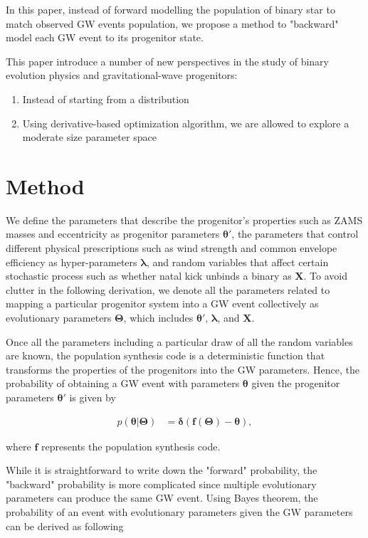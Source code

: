 \documentclass[twocolumn]{aastex631}
\begin{document}
In this paper, instead of forward modelling the population of binary star to match observed GW events population,
we propose a method to "backward" model each GW event to its progenitor state.


This paper introduce a number of new perspectives in the study of binary evolution physics and gravitational-wave progenitors:
\begin{enumerate}
\item Instead of starting from a distribution 
\item Using derivative-based optimization algorithm, we are allowed to explore a moderate size parameter space 
\end{enumerate}

\section{Method}

We define the parameters that describe the progenitor's properties such as ZAMS masses and eccentricity as progenitor parameters $\bm{\theta'}$,
the parameters that control different physical prescriptions such as wind strength and common envelope efficiency as hyper-parameters $\bm{\lambda}$,
and random variables that affect certain stochastic process such as whether natal kick unbinds a binary as $\bm{X}$.
To avoid clutter in the following derivation,
we denote all the parameters related to mapping a particular progenitor system into a GW event collectively as evolutionary parameters $\bm{\Theta}$,
which includes $\bm{\theta'}$, $\bm{\lambda}$, and $\bm{X}$.

Once all the parameters including a particular draw of all the random variables are known,
the population synthesis code is a deterministic function that transforms the properties of the progenitors into the GW parameters.
Hence, the probability of obtaining a GW event with parameters $\bm{\theta}$ given the progenitor parameters $\bm{\theta}'$ is given by

\begin{align}
    p(\bm{\theta}|\bm{\Theta}) &= \bm{\delta}(\bm{f}(\bm{\Theta})-\bm{\theta}),
\end{align}

where $\bm{f}$ represents the population synthesis code.

While it is straightforward to write down the "forward" probability, the "backward" probability is more complicated since multiple evolutionary parameters can produce the same GW event.
Using Bayes theorem, the probability of an event with evolutionary parameters given the GW parameters can be derived as following
\end{document}
